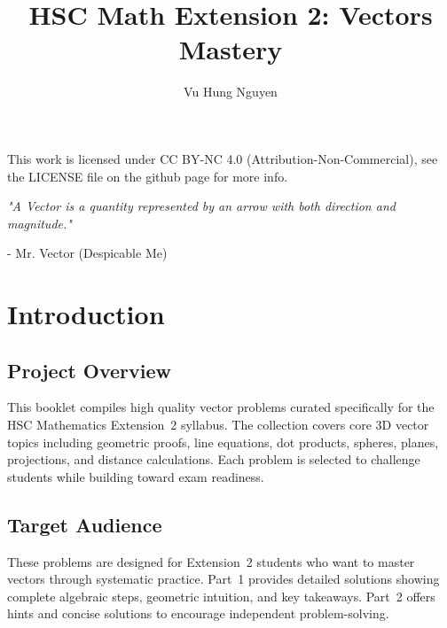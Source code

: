 \documentclass[12pt]{article}
\author{Vu Hung Nguyen}
\title{HSC Math Extension 2: Vectors Mastery}
\date{}
\begin{document}


\newpage
\thispagestyle{empty}


\begingroup\small\noindent This work is licensed under CC BY-NC 4.0 (Attribution-Non-Commercial), see the LICENSE file on the github page for more info.\par\endgroup

\newpage
\thispagestyle{empty}
\vspace*{\fill}
\begin{center}
\itshape
"A Vector is a quantity represented by an arrow with both direction and magnitude."

\vspace{1em}
\normalfont - Mr. Vector (Despicable Me)
\end{center}
\vspace*{\fill}

\newpage
\tableofcontents
\newpage

\section{Introduction}

\subsection{Project Overview}
This booklet compiles high quality vector problems curated specifically for the HSC Mathematics Extension~2 syllabus. The collection covers core 3D vector topics including geometric proofs, line equations, dot products, spheres, planes, projections, and distance calculations. Each problem is selected to challenge students while building toward exam readiness.

\subsection{Target Audience}
These problems are designed for Extension~2 students who want to master vectors through systematic practice. Part~1 provides detailed solutions showing complete algebraic steps, geometric intuition, and key takeaways. Part~2 offers hints and concise solutions to encourage independent problem-solving.
\end{document}
